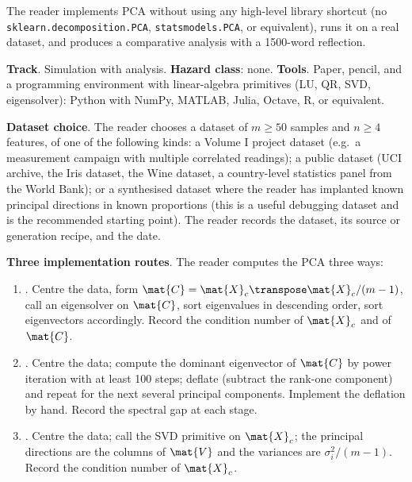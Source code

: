 \begin{project}
The reader implements PCA without using any high-level library
shortcut (no \texttt{sklearn.decomposition.PCA},
\texttt{statsmodels.PCA}, or equivalent), runs it on a real
dataset, and produces a comparative analysis with a 1500-word
reflection.

\textbf{Track}. Simulation with analysis. \textbf{Hazard class}: none.
\textbf{Tools}. Paper, pencil, and a programming environment with
linear-algebra primitives (LU, QR, SVD, eigensolver): Python with
NumPy, MATLAB, Julia, Octave, R, or equivalent.

\textbf{Dataset choice}. The reader chooses a dataset of $m \geq 50$
samples and $n \geq 4$ features, of one of the following kinds: a
Volume I project dataset (e.g.\ a measurement campaign with
multiple correlated readings); a public dataset (UCI archive,
the Iris dataset, the Wine dataset, a country-level statistics
panel from the World Bank); or a synthesised dataset where the
reader has implanted known principal directions in known proportions
(this is a useful debugging dataset and is the recommended starting
point). The reader records the dataset, its source or generation
recipe, and the date.

\textbf{Three implementation routes}. The reader computes the PCA
three ways:

\begin{enumerate}[leftmargin=*]
  \item {}.
    Centre the data, form $\mat{C} = \mat{X}_{c}\transpose
    \mat{X}_{c}/(m-1)$, call an eigensolver on $\mat{C}$, sort
    eigenvalues in descending order, sort eigenvectors accordingly.
    Record the condition number of $\mat{X}_{c}$ and of $\mat{C}$.
  \item {}. Centre the data; compute the
    dominant eigenvector of $\mat{C}$ by power iteration with at
    least 100 steps; deflate (subtract the rank-one component) and
    repeat for the next several principal components. Implement
    the deflation by hand. Record the spectral gap at each stage.
  \item {}. Centre the data;
    call the SVD primitive on $\mat{X}_{c}$; the principal
    directions are the columns of $\mat{V}$ and the variances are
    $\sigma_{i}^{2}/(m-1)$. Record the condition number of
    $\mat{X}_{c}$.
\end{enumerate}


\end{project}
